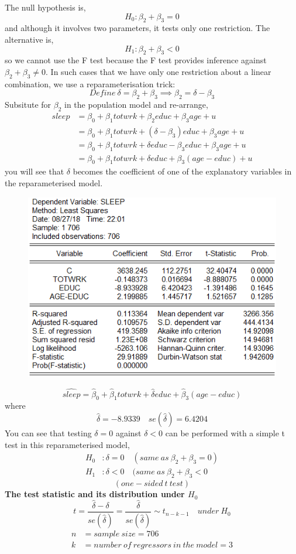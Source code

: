 \documentclass[12pt]{report}
\begin{document}
\noindent The null hypothesis is,
$$H_0: \beta_2 + \beta_3 = 0$$ 
and although it involves two parameters, it tests only one restriction. The alternative is, 
$$H_1: \beta_2 + \beta_3 < 0$$ so we cannot use the F test because the F test provides inference against $\beta_2 + \beta_3 \neq 0$. In such cases that we have only one restriction about a linear combination, we use a reparameterisation trick: 
$$Define\ \delta = \beta_2 + \beta_3 \implies \beta_2 = \delta - \beta_3$$
Subsitute for $\beta_2$ in the population model and re-arrange, \begin{align*}
	sleep &= \beta_0 + \beta_1 totwrk + \beta_2 educ + \beta_3 age + u \\
	&= \beta_0 + \beta_1 totwrk + (\delta - \beta_3) educ + \beta_3 age + u \\
	&= \beta_0 + \beta_1 totwrk + \delta educ - \beta_3 educ + \beta_3 age + u \\
	&= \beta_0 + \beta_1 totwrk + \delta educ + \beta_3 (age - educ) + u 
\end{align*} you will see that $\delta$ becomes the coefficient of one of the explanatory variables in the reparameterised model. \begin{figure}[H]
	\centerline{\includegraphics{tute6_q2_10}}
\end{figure}
\vspace{-\baselineskip} $$\widehat{sleep} = \hat{\beta}_0 + \hat{\beta}_1 totwrk + \hat{\delta} educ + \hat{\beta}_3 (age - educ)$$ where $$\hat{\delta} = -8.9339 \quad se(\hat{\delta}) = 6.4204$$
\noindent You can see that testing $\delta = 0$ against $\delta < 0$ can be performed with a simple t test in this reparameterised model,
\begin{align*}
	H_0&: \delta = 0 \quad (same\ as\ \beta_2 + \beta_3 = 0) \\
	H_1&: \delta < 0 \quad (same\ as\ \beta_2 + \beta_3 < 0
\end{align*}
$$(one-sided\ t\ test)$$
\noindent \textbf{The test statistic and its distribution under $H_0$}
$$t = \dfrac{\hat{\delta} - \delta}{se(\hat{\delta})} = \dfrac{\hat{\delta}}{se(\hat{\delta})} \sim t_{n-k-1} \quad under\ H_0$$
\begin{align*}
n &= sample\ size = 706 \\
k &= number\ of\ regressors\ in\ the\ model = 3
\end{align*}
\end{document}
